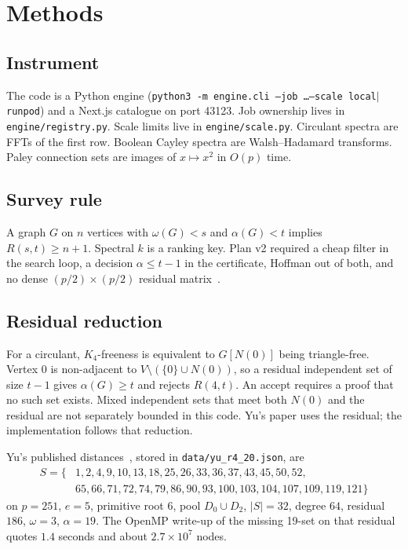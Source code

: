 \documentclass[11pt,a4paper]{article}
\begin{document}
\section{Methods}

\subsection{Instrument}

The code is a Python engine
(\texttt{python3 -m engine.cli --job \ldots --scale local$\vert$runpod})
and a Next.js catalogue on port 43123. Job ownership lives in
\texttt{engine/registry.py}. Scale limits live in
\texttt{engine/scale.py}. Circulant spectra are FFTs of the first row.
Boolean Cayley spectra are Walsh--Hadamard transforms. Paley connection
sets are images of $x\mapsto x^2$ in $O(p)$ time.

\subsection{Survey rule}

A graph $G$ on $n$ vertices with $\omega(G)<s$ and $\alpha(G)<t$ implies
$R(s,t)\ge n+1$. Spectral $k$ is a ranking key. Plan v2 required a cheap
filter in the search loop, a decision $\alpha\le t-1$ in the certificate,
Hoffman out of both, and no dense $(p/2)\times(p/2)$ residual
matrix~\cite{planv2}.

\subsection{Residual reduction}

For a circulant, $K_4$-freeness is equivalent to $G[N(0)]$ being
triangle-free. Vertex 0 is non-adjacent to
$V\setminus(\{0\}\cup N(0))$, so a residual independent set of size
$t-1$ gives $\alpha(G)\ge t$ and rejects $R(4,t)$. An accept requires
a proof that no such set exists. Mixed independent sets that meet both
$N(0)$ and the residual are not separately bounded in this code. Yu's
paper uses the residual; the implementation follows that reduction.

Yu's published distances~\cite{yu}, stored in
\texttt{data/yu\_r4\_20.json}, are
\[
\begin{aligned}
S=\{&1,2,4,9,10,13,18,25,26,33,36,37,43,45,50,52,\\
&65,66,71,72,74,79,86,90,93,100,103,104,107,109,119,121\}
\end{aligned}
\]
on $p=251$, $e=5$, primitive root $6$, pool $D_0\cup D_2$, $|S|=32$,
degree $64$, residual $186$, $\omega=3$, $\alpha=19$. The OpenMP
write-up of the missing 19-set on that residual quotes $1.4$ seconds
and about $2.7\times 10^7$ nodes.
\end{document}
